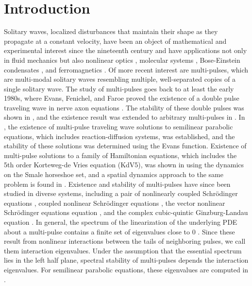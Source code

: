 \documentclass[10pt,reqno]{amsart}
\theoremstyle{plain}
\theoremstyle{definition}
\theoremstyle{remark}
\numberwithin{theorem}{section}
\numberwithin{equation}{section}
\begin{document}
\section{Introduction}\label{sec:intro}

Solitary waves, localized disturbances that maintain their shape as they propagate at a constant velocity, have been an object of mathematical and experimental interest since the nineteenth century and have applications not only in fluid mechanics but also nonlinear optics \cite{Taylor1992}, molecular systems \cite{Davydov1985}, Bose-Einstein condensates \cite{Panos2008BEC}, and ferromagnetics \cite{Kosevich1998}. Of more recent interest are multi-pulses, which are multi-modal solitary waves resembling multiple, well-separated copies of a single solitary wave. The study of multi-pulses goes back to at least the early 1980s, where Evans, Fenichel, and Faroe proved the existence of a double pulse traveling wave in nerve axon equations \cite{Evans1982}. The stability of these double pulses was shown in \cite{Yanagida1989}, and the existence result was extended to arbitrary multi-pulses in \cite{Feroe1986}. In \cite{Alexander1994}, the existence of multi-pulse traveling wave solutions to semilinear parabolic equations, which includes reaction-diffusion systems, was established, and the stability of these solutions was determined using the Evans function. Existence of multi-pulse solutions to a family of Hamiltonian equations, which includes the 5th order Korteweg-de Vries equation (KdV5), was shown in \cite{Buffoni1996} using the dynamics on the Smale horseshoe set, and a spatial dynamics approach to the same problem is found in \cite{SandstedeStrut}. Existence and stability of multi-pulses have since been studied in diverse systems, including a pair of nonlinearly coupled Schr\"{o}dinger equations \cite{Yew2001,Yew2000}, coupled nonlinear Schr\"{o}dinger equations \cite{Pelinovsky2001,Pelinovsky2005}, the vector nonlinear Schr\"{o}dinger equations equation \cite{Kapitula2007}, and the complex cubic-quintic Ginzburg-Landau equation \cite{Manukian2009}. In general, the spectrum of the linearization of the underlying PDE about a multi-pulse contains a finite set of eigenvalues close to 0 \cite{Alexander1990,Sandstede1998}. Since these result from nonlinear interactions between the tails of neighboring pulses, we call them interaction eigenvalues. Under the assumption that the essential spectrum lies in the left half plane, spectral stability of multi-pulses depends the interaction eigenvalues. For semilinear parabolic equations, these eigenvalues are computed in \cite{Sandstede1998}. 
\end{document}
